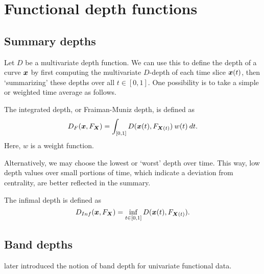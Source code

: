 \section{Functional depth functions}

\subsection{Summary depths}

Let $D$ be a multivariate depth function.
We can use this to define the depth of a curve $\bm{x}$ by first computing the
multivariate $D$-depth of each time slice $\bm{x}(t)$, then `summarizing' these
depths over all $t \in [0, 1]$.
One possibility is to take a simple or weighted time average as follows.

\begin{definition}
    The integrated depth, or Fraiman-Muniz depth, is defined as
    \begin{equation}
        D_F(\bm{x}, F_{\bm{X}}) = \int_{[0, 1]} D(\bm{x}(t), F_{\bm{X}(t)})\:w(t)\:dt.
    \end{equation}
    Here, $w$ is a weight function.
\end{definition}

Alternatively, we may choose the lowest or `worst' depth over time.
This way, low depth values over small portions of time, which indicate a
deviation from centrality, are better reflected in the summary.

\begin{definition}
    The infimal depth is defined as
    \begin{equation}
        D_{Inf}(\bm{x}, F_{\bm{X}}) = \inf_{t \in [0, 1]} D(\bm{x}(t), F_{\bm{X}(t)}).
    \end{equation}
\end{definition}



\subsection{Band depths}

\textcite{pintado-romo-2009} later introduced the notion of band depth for
univariate functional data.

